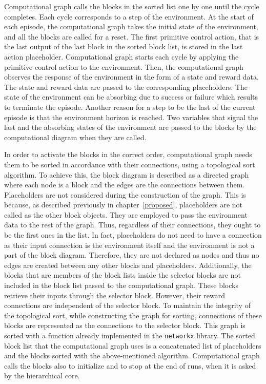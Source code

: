 Computational graph calls the blocks in the sorted list one by one until the cycle completes. Each cycle corresponds to a step of the environment. 
At the start of each episode, the computational graph takes the initial state of the environment, and all the blocks are called for a reset. The first primitive control action, that is the last output of the last block in the sorted block list, is stored in the last action placeholder. Computational graph starts each cycle by applying the primitive control action to the environment. Then, the computational graph observes the response of the environment in the form of a state and reward data. The state and reward data are passed to the corresponding placeholders. The state of the environment can be absorbing due to success or failure which results to terminate the episode. Another reason for a step to be the last of the current episode is that the environment horizon is reached. Two variables that signal the last and the absorbing states of the environment are passed to the blocks by the computational diagram when they are called.

In order to activate the blocks in the correct order, computational graph needs them to be sorted in accordance with their connections, using a topological sort algorithm. To achieve this, the block diagram is described as a directed graph where each node is a block and the edges are the connections between them. Placeholders are not considered during the construction of the graph. This is because, as described previously in chapter~\ref{proposed}, placeholders are not called as the other block objects. They are employed to pass the environment data to the rest of the graph. Thus, regardless of their connections, they ought to be the first ones in the list. In fact, placeholders do not need to have a connection as their input connection is the environment itself and the environment is not a part of the block diagram. Therefore, they are not declared as nodes and thus no edges are created between any other blocks and placeholders. Additionally, the blocks that are members of the block lists inside the selector blocks are not included in the block list passed to the computational graph. These blocks retrieve their inputs through the selector block. However, their reward connections are independent of the selector block. To maintain the integrity of the topological sort, while constructing the graph for sorting, connections of these blocks are represented as the connections to the selector block. 
This graph is sorted with a function already implemented in the \texttt{networkx} library. The sorted block list that the computational graph uses is a concatenated list of placeholders and the blocks sorted with the above-mentioned algorithm.
Computational graph calls the blocks also to initialize and to stop at the end of runs, when it is asked by the hierarchical core.

